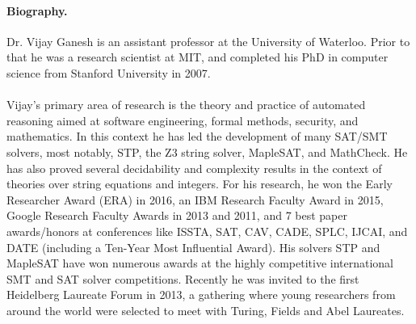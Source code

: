 \documentclass[EPiCempty]{easychair}
\begin{document}
\paragraph{Biography.} Dr. Vijay Ganesh is an assistant professor at the
University of Waterloo. Prior to that he was a research scientist at MIT, and
completed his PhD in computer science from Stanford University in 2007.
\\\\
Vijay's primary area of research is the theory and practice of automated
reasoning aimed at software engineering, formal methods, security, and
mathematics. In this context he has led the development of many SAT/SMT
solvers, most notably, STP, the Z3 string solver, MapleSAT, and MathCheck. He
has also proved several decidability and complexity results in the context of
theories over string equations and integers. For his research, he won the Early
Researcher Award (ERA) in 2016, an IBM Research Faculty Award in 2015, Google
Research Faculty Awards in 2013 and 2011, and 7 best paper awards/honors at
conferences like ISSTA, SAT, CAV, CADE, SPLC, IJCAI, and DATE (including a
Ten-Year Most Influential Award). His solvers STP and MapleSAT have won
numerous awards at the highly competitive international SMT and SAT solver
competitions. Recently he was invited to the first Heidelberg Laureate Forum in
2013, a gathering where young researchers from around the world were selected
to meet with Turing, Fields and Abel Laureates. 
\end{document}
